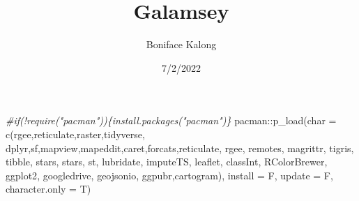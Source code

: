 \documentclass[
]{report}
\title{Galamsey}
\author{Boniface Kalong}
\date{7/2/2022}
\newenvironment{Shaded}{\begin{snugshade}}{\end{snugshade}}
\newcommand{\AttributeTok}[1]{\textcolor[rgb]{0.77,0.63,0.00}{#1}}
\newcommand{\CommentTok}[1]{\textcolor[rgb]{0.56,0.35,0.01}{\textit{#1}}}
\newcommand{\FunctionTok}[1]{\textcolor[rgb]{0.00,0.00,0.00}{#1}}
\newcommand{\NormalTok}[1]{#1}
\newcommand{\SpecialCharTok}[1]{\textcolor[rgb]{0.00,0.00,0.00}{#1}}
\newcommand{\StringTok}[1]{\textcolor[rgb]{0.31,0.60,0.02}{#1}}
\begin{document}
\maketitle

\begin{Shaded}
\begin{Highlighting}[]
\CommentTok{\#if(!require("pacman"))\{install.packages("pacman")\}}
\NormalTok{pacman}\SpecialCharTok{::}\FunctionTok{p\_load}\NormalTok{(}\AttributeTok{char =} \FunctionTok{c}\NormalTok{(}\StringTok{\textquotesingle{}rgee\textquotesingle{}}\NormalTok{,}\StringTok{\textquotesingle{}reticulate\textquotesingle{}}\NormalTok{,}\StringTok{\textquotesingle{}raster\textquotesingle{}}\NormalTok{,}\StringTok{\textquotesingle{}tidyverse\textquotesingle{}}\NormalTok{,}
                        \StringTok{\textquotesingle{}dplyr\textquotesingle{}}\NormalTok{,}\StringTok{\textquotesingle{}sf\textquotesingle{}}\NormalTok{,}\StringTok{\textquotesingle{}mapview\textquotesingle{}}\NormalTok{,}\StringTok{\textquotesingle{}mapeddit\textquotesingle{}}\NormalTok{,}\StringTok{\textquotesingle{}caret\textquotesingle{}}\NormalTok{,}\StringTok{\textquotesingle{}forcats\textquotesingle{}}\NormalTok{,}\StringTok{\textquotesingle{}reticulate\textquotesingle{}}\NormalTok{,}
                        \StringTok{\textquotesingle{}rgee\textquotesingle{}}\NormalTok{, }\StringTok{\textquotesingle{}remotes\textquotesingle{}}\NormalTok{, }\StringTok{\textquotesingle{}magrittr\textquotesingle{}}\NormalTok{, }\StringTok{\textquotesingle{}tigris\textquotesingle{}}\NormalTok{, }\StringTok{\textquotesingle{}tibble\textquotesingle{}}\NormalTok{, }\StringTok{\textquotesingle{}stars\textquotesingle{}}\NormalTok{, }\StringTok{\textquotesingle{}stars\textquotesingle{}}\NormalTok{,}
                        \StringTok{\textquotesingle{}st\textquotesingle{}}\NormalTok{, }\StringTok{\textquotesingle{}lubridate\textquotesingle{}}\NormalTok{, }\StringTok{\textquotesingle{}imputeTS\textquotesingle{}}\NormalTok{, }\StringTok{\textquotesingle{}leaflet\textquotesingle{}}\NormalTok{, }\StringTok{\textquotesingle{}classInt\textquotesingle{}}\NormalTok{, }\StringTok{\textquotesingle{}RColorBrewer\textquotesingle{}}\NormalTok{,}
                        \StringTok{\textquotesingle{}ggplot2\textquotesingle{}}\NormalTok{, }\StringTok{\textquotesingle{}googledrive\textquotesingle{}}\NormalTok{, }\StringTok{\textquotesingle{}geojsonio\textquotesingle{}}\NormalTok{, }\StringTok{\textquotesingle{}ggpubr\textquotesingle{}}\NormalTok{,}\StringTok{\textquotesingle{}cartogram\textquotesingle{}}\NormalTok{), }
               \AttributeTok{install =}\NormalTok{ F, }\AttributeTok{update =}\NormalTok{ F, }\AttributeTok{character.only =}\NormalTok{ T)}
\end{Highlighting}
\end{Shaded}
\end{document}
